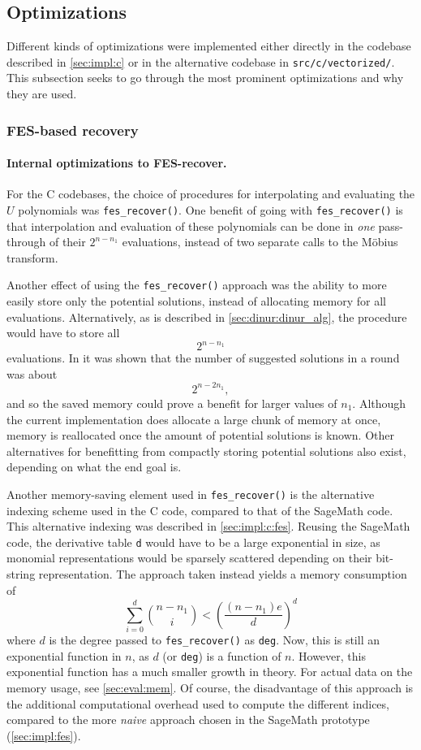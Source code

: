 \subsection{Optimizations} \label{sec:impl:opt}
Different kinds of optimizations were implemented either directly in the codebase described in \cref{sec:impl:c} or in the alternative codebase in \texttt{src/c/vectorized/}. This subsection seeks to go through the most prominent optimizations and why they are used.

\subsubsection{FES-based recovery} \label{sec:impl:opt:fes_rec}
\paragraph{Internal optimizations to FES-recover.} For the C codebases, the choice of procedures for interpolating and evaluating the $U$ polynomials was \texttt{fes\_recover()}. One benefit of going with \texttt{fes\_recover()} is that interpolation and evaluation of these polynomials can be done in \textit{one} pass-through of their $2^{n - n_1}$ evaluations, instead of two separate calls to the Möbius transform.

Another effect of using the \texttt{fes\_recover()} approach was the ability to more easily store only the potential solutions, instead of allocating memory for all evaluations. Alternatively, as is described in \cref{sec:dinur:dinur_alg}, the procedure would have to store all 
$$
    2^{n - n_1}
$$ 
evaluations. In \cite{eurocrypt-2021-30841} it was shown that the number of suggested solutions in a round was about 
$$
    2^{n - 2n_1},
$$
and so the saved memory could prove a benefit for larger values of $n_1$. Although the current implementation does allocate a large chunk of memory at once, memory is reallocated once the amount of potential solutions is known. Other alternatives for benefitting from compactly storing potential solutions also exist, depending on what the end goal is.

Another memory-saving element used in \texttt{fes\_recover()} is the alternative indexing scheme used in the C code, compared to that of the SageMath code. This alternative indexing was described in \cref{sec:impl:c:fes}. Reusing the SageMath code, the derivative table \texttt{d} would have to be a large exponential in size, as monomial representations would be sparsely scattered depending on their bit-string representation. The approach taken instead yields a memory consumption of 
$$
    \sum_{i = 0 }^{d} \binom{n - n_1}{i} < \left(\frac{(n - n_1)e}{d}\right)^d
$$
where $d$ is the degree passed to \texttt{fes\_recover()} as \texttt{deg}. Now, this is still an exponential function in $n$, as $d$ (or \texttt{deg}) is a function of $n$. However, this exponential function has a much smaller growth in theory. For actual data on the memory usage, see \cref{sec:eval:mem}. Of course, the disadvantage of this approach is the additional computational overhead used to compute the different indices, compared to the more \textit{naive} approach chosen in the SageMath prototype (\cref{sec:impl:fes}).

